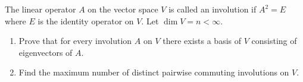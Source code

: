 \documentclass{article}
\begin{document}
	\setlength{\parindent}{0pt}
	The linear operator $A$ on the vector space $V$ is called an involution if $A^2=E$ where $E$ is the identity operator on $V$. Let $\dim V=n<\infty$.
	\begin{enumerate}[label=(\roman*)]
		\item  Prove that for every involution $A$ on $V$ there exists a basis of $V$ consisting of eigenvectors of $A$.
		\item Find the maximum number of distinct pairwise commuting involutions on $V$.
	\end{enumerate}
\end{document}
